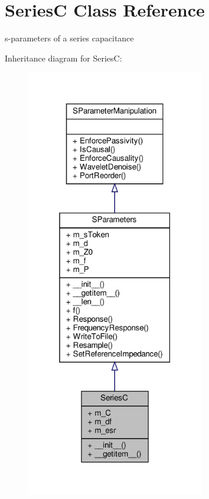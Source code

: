 \hypertarget{classSignalIntegrity_1_1SParameters_1_1Devices_1_1SeriesC_1_1SeriesC}{}\section{SeriesC Class Reference}
\label{classSignalIntegrity_1_1SParameters_1_1Devices_1_1SeriesC_1_1SeriesC}


s-\/parameters of a series capacitance  




Inheritance diagram for SeriesC\+:
\nopagebreak
\begin{figure}[H]
\begin{center}
\leavevmode
\includegraphics[width=220pt]{classSignalIntegrity_1_1SParameters_1_1Devices_1_1SeriesC_1_1SeriesC__inherit__graph}
\end{center}
\end{figure}


